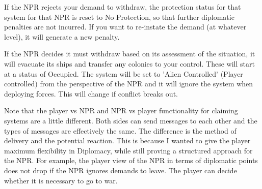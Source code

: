 \documentclass[../../Aurora C# unofficial manual.tex]{subfiles}
\begin{document}
	If the NPR rejects your demand to withdraw, the protection status for that system for that NPR is reset to No Protection, so that further diplomatic penalties are not incurred. If you want to re-instate the demand (at whatever level), it will generate a new penalty.
	
	If the NPR decides it must withdraw based on its assessment of the situation, it will evacuate its ships and transfer any colonies to your control. These will start at a status of Occupied. The system will be set to 'Alien Controlled' (Player controlled) from the perspective of the NPR and it will ignore the system when deploying forces. This will change if conflict breaks out.
	
	Note that the player vs NPR and NPR vs player functionality for claiming systems are a little different. Both sides can send messages to each other and the types of messages are effectively the same. The difference is the method of delivery and the potential reaction. This is because I wanted to give the player maximum flexibility in Diplomacy, while still proving a structured approach for the NPR. For example, the player view of the NPR in terms of diplomatic points does not drop if the NPR ignores demands to leave. The player can decide whether it is necessary to go to war.
\end{document}
